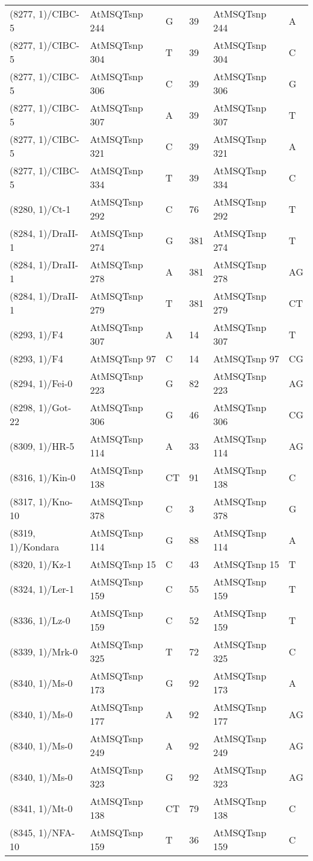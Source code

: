 \begin{center}
\begin{longtable}{|l|l|l|l|l|l|}
(8277, 1)/CIBC-5&AtMSQTsnp 244&G&39&AtMSQTsnp 244&A\\
(8277, 1)/CIBC-5&AtMSQTsnp 304&T&39&AtMSQTsnp 304&C\\
(8277, 1)/CIBC-5&AtMSQTsnp 306&C&39&AtMSQTsnp 306&G\\
(8277, 1)/CIBC-5&AtMSQTsnp 307&A&39&AtMSQTsnp 307&T\\
(8277, 1)/CIBC-5&AtMSQTsnp 321&C&39&AtMSQTsnp 321&A\\
(8277, 1)/CIBC-5&AtMSQTsnp 334&T&39&AtMSQTsnp 334&C\\
(8280, 1)/Ct-1&AtMSQTsnp 292&C&76&AtMSQTsnp 292&T\\
(8284, 1)/DraII-1&AtMSQTsnp 274&G&381&AtMSQTsnp 274&T\\
(8284, 1)/DraII-1&AtMSQTsnp 278&A&381&AtMSQTsnp 278&AG\\
(8284, 1)/DraII-1&AtMSQTsnp 279&T&381&AtMSQTsnp 279&CT\\
(8293, 1)/F4&AtMSQTsnp 307&A&14&AtMSQTsnp 307&T\\
(8293, 1)/F4&AtMSQTsnp 97&C&14&AtMSQTsnp 97&CG\\
(8294, 1)/Fei-0&AtMSQTsnp 223&G&82&AtMSQTsnp 223&AG\\
(8298, 1)/Got-22&AtMSQTsnp 306&G&46&AtMSQTsnp 306&CG\\
(8309, 1)/HR-5&AtMSQTsnp 114&A&33&AtMSQTsnp 114&AG\\
(8316, 1)/Kin-0&AtMSQTsnp 138&CT&91&AtMSQTsnp 138&C\\
(8317, 1)/Kno-10&AtMSQTsnp 378&C&3&AtMSQTsnp 378&G\\
(8319, 1)/Kondara&AtMSQTsnp 114&G&88&AtMSQTsnp 114&A\\
(8320, 1)/Kz-1&AtMSQTsnp 15&C&43&AtMSQTsnp 15&T\\
(8324, 1)/Ler-1&AtMSQTsnp 159&C&55&AtMSQTsnp 159&T\\
(8336, 1)/Lz-0&AtMSQTsnp 159&C&52&AtMSQTsnp 159&T\\
(8339, 1)/Mrk-0&AtMSQTsnp 325&T&72&AtMSQTsnp 325&C\\
(8340, 1)/Ms-0&AtMSQTsnp 173&G&92&AtMSQTsnp 173&A\\
(8340, 1)/Ms-0&AtMSQTsnp 177&A&92&AtMSQTsnp 177&AG\\
(8340, 1)/Ms-0&AtMSQTsnp 249&A&92&AtMSQTsnp 249&AG\\
(8340, 1)/Ms-0&AtMSQTsnp 323&G&92&AtMSQTsnp 323&AG\\
(8341, 1)/Mt-0&AtMSQTsnp 138&CT&79&AtMSQTsnp 138&C\\
(8345, 1)/NFA-10&AtMSQTsnp 159&T&36&AtMSQTsnp 159&C\\

\end{longtable}
\end{center}
